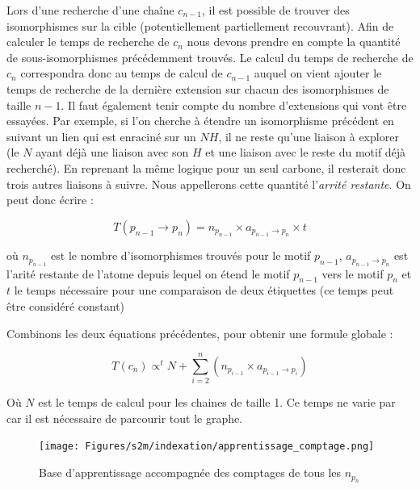 Lors d'une recherche d'une chaîne $c_{n-1}$, il est possible de trouver des isomorphismes sur la cible (potentiellement partiellement recouvrant).
Afin de calculer le temps de recherche de $c_n$ nous devons prendre en compte la quantité de sous-isomorphismes précédemment trouvés.
Le calcul du temps de recherche de $c_n$ correspondra donc au temps de calcul de $c_{n-1}$ auquel on vient ajouter le temps de recherche de la dernière extension sur chacun des isomorphismes de taille $n-1$.
Il faut également tenir compte du nombre d'extensions qui vont être essayées.
Par exemple, si l'on cherche à étendre un isomorphisme précédent en suivant un lien qui est enraciné sur un $NH$, il ne reste qu'une liaison à explorer (le $N$ ayant déjà une liaison avec son $H$ et une liaison avec le reste du motif déjà recherché).
En reprenant la même logique pour un seul carbone, il resterait donc trois autres liaisons à suivre.
Nous appellerons cette quantité l'\textit{arrité restante}.
On peut donc écrire :

\begin{equation}
 T(p_{n-1} \rightarrow p_n) = n_{p_{n-1}} \times a_{p_{n-1} \rightarrow p_n} \times t
\end{equation}

où $n_{p_{n-1}}$ est le nombre d'isomorphismes trouvés pour le motif $p_{n-1}$, $a_{p_{n-1} \rightarrow p_n}$ est l'arité restante
de l'atome depuis lequel on étend le motif $p_{n-1}$ vers le motif $p_n$ et $t$ le temps nécessaire pour une comparaison de deux
étiquettes (ce temps peut être considéré constant)

Combinons les deux équations précédentes, pour obtenir une formule globale :

\begin{equation}
 T(c_n) \propto^t N + \sum_{i=2}^n (n_{p_{i-1}} \times a_{p_{i-1} \rightarrow p_i})
\end{equation}

Où $N$ est le temps de calcul pour les chaines de taille 1.
Ce temps ne varie par car il est nécessaire de parcourir tout le graphe.

\begin{figure}[!ht]
  \begin{center}
    \texttt{[image: Figures/s2m/indexation/apprentissage\_comptage.png]}
    \caption{\label{app_compt}Base d'apprentissage accompagnée des comptages de tous les $n_{p_{n}}$}
  \end{center}
\end{figure}

